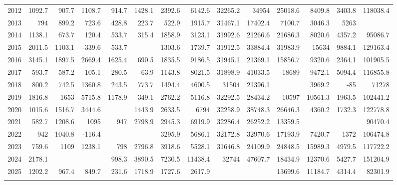 \begin{longtable}[t]{crrrrrrrrrrrrr}
2012 & 1092.7 & 907.7 & 1108.7 & 914.7 & 1428.1 & 2392.6 & 6142.6 & 32265.2 & 34954 & 25018.6 & 8409.8 & 3403.8 & 118038.4\\
2013 & 794 & 899.2 & 723.6 & 428.8 & 223.7 & 522.9 & 1915.7 & 31467.1 & 17402.4 & 7100.7 & 3046.3 & 5263 & \cellcolor{green}{69787.6}\\
2014 & 1138.1 & 673.7 & 120.4 & 533.7 & 315.4 & 1858.9 & 3123.1 & 31992.6 & 21266.6 & 21686.3 & 8020.6 & 4357.2 & 95086.7\\
2015 & 2011.5 & 1103.1 & -339.6 & 533.7 & \cellcolor{green}{-487.5} & 1303.6 & 1739.7 & 31912.5 & 33884.4 & 31983.9 & 15634 & 9884.1 & 129163.4\\
2016 & 3145.1 & 1897.5 & 2669.4 & 1625.4 & 690.5 & 1835.5 & 9186.5 & 31945.1 & 21369.1 & 15856.7 & 9320.6 & 2364.1 & 101905.5\\
2017 & 593.7 & 587.2 & 105.1 & 280.5 & -63.9 & 1143.8 & 8021.5 & 31898.9 & 41033.5 & 18689 & 9472.1 & 5094.4 & 116855.8\\
2018 & 800.2 & 742.5 & 1360.8 & 243.5 & 773.7 & 1494.4 & 4600.5 & 31504 & 21396.1 & \cellcolor{green}{4478} & 3969.2 & -85 & 71278\\
2019 & 1816.8 & 1653 & 5715.8 & 1178.9 & 349.1 & 2762.2 & 5116.8 & 32292.5 & 28434.2 & 10597 & 10561.3 & 1963.5 & 102441.2\\
2020 & 1015.6 & 1516.7 & 3444.6 & \cellcolor{red}{2184.6} & 1443.9 & 2633.5 & 6794 & 32258.9 & 38748.3 & 26646.3 & 4360.2 & 1732.3 & 122778.8\\
2021 & 582.7 & 1208.6 & 1095 & 947 & 2798.9 & 2945.3 & 6919.9 & 32286.4 & 26252.2 & 13359.5 & \cellcolor{green}{2734.6} & \cellcolor{green}{-659.8} & 90470.4\\
2022 & 942 & 1040.8 & -116.4 & \cellcolor{green}{211.9} & \cellcolor{red}{4284.6} & 3295.9 & 5686.1 & 32172.8 & 32970.6 & 17193.9 & 7420.7 & 1372 & 106474.8\\
2023 & 759.6 & 1109 & 1238.1 & 798 & 2796.8 & 3918.6 & 5528.1 & 31646.8 & 24109.9 & 24848.5 & 15989.3 & 4979.5 & 117722.2\\
2024 & 2178.1 & \cellcolor{red}{2768} & \cellcolor{red}{6116.2} & 998.3 & 3890.5 & 7230.5 & 11438.4 & 32744 & 47607.7 & 18434.9 & 12370.6 & 5427.7 & 151204.9\\
2025 & 1202.2 & 967.4 & 849.7 & 231.6 & 1718.9 & 1727.6 & 2617.9 & \cellcolor{green}{31387.1} & \cellcolor{green}{12400.8} & 13699.6 & 11184.7 & 4314.4 & 82301.9\\
\midrule
\cellcolor{red}{Max} & \cellcolor{red}{3900.1} & \cellcolor{red}{2768} & \cellcolor{red}{6116.2} & \cellcolor{red}{2184.6} & \cellcolor{red}{4284.6} & \cellcolor{red}{12059.7} & \cellcolor{red}{16945} & \cellcolor{red}{33351} & \cellcolor{red}{84817.8} & \cellcolor{red}{52721.9} & \cellcolor{red}{32136.4} & \cellcolor{red}{18543.5} & \cellcolor{red}{234060.9}\\

\end{longtable}
